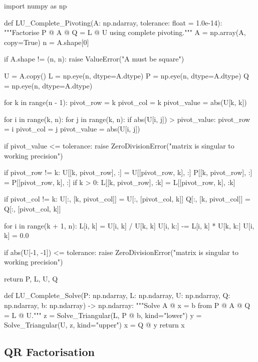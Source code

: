 \begin{python}
import numpy as np


def LU_Complete_Pivoting(A: np.ndarray,
                         tolerance: float = 1.0e-14):
    """Factorise P @ A @ Q = L @ U using complete pivoting."""
    A = np.array(A, copy=True)
    n = A.shape[0]

    if A.shape != (n, n):
        raise ValueError("A must be square")

    U = A.copy()
    L = np.eye(n, dtype=A.dtype)
    P = np.eye(n, dtype=A.dtype)
    Q = np.eye(n, dtype=A.dtype)

    for k in range(n - 1):
        pivot_row = k
        pivot_col = k
        pivot_value = abs(U[k, k])

        for i in range(k, n):
            for j in range(k, n):
                if abs(U[i, j]) > pivot_value:
                    pivot_row = i
                    pivot_col = j
                    pivot_value = abs(U[i, j])

        if pivot_value <= tolerance:
            raise ZeroDivisionError("matrix is singular to working precision")

        if pivot_row != k:
            U[[k, pivot_row], :] = U[[pivot_row, k], :]
            P[[k, pivot_row], :] = P[[pivot_row, k], :]
            if k > 0:
                L[[k, pivot_row], :k] = L[[pivot_row, k], :k]

        if pivot_col != k:
            U[:, [k, pivot_col]] = U[:, [pivot_col, k]]
            Q[:, [k, pivot_col]] = Q[:, [pivot_col, k]]

        for i in range(k + 1, n):
            L[i, k] = U[i, k] / U[k, k]
            U[i, k:] -= L[i, k] * U[k, k:]
            U[i, k] = 0.0

    if abs(U[-1, -1]) <= tolerance:
        raise ZeroDivisionError("matrix is singular to working precision")

    return P, L, U, Q


def LU_Complete_Solve(P: np.ndarray,
                      L: np.ndarray,
                      U: np.ndarray,
                      Q: np.ndarray,
                      b: np.ndarray) -> np.ndarray:
    """Solve A @ x = b from P @ A @ Q = L @ U."""
    z = Solve_Triangular(L, P @ b, kind="lower")
    y = Solve_Triangular(U, z, kind="upper")
    x = Q @ y
    return x
\end{python}

\subsection{QR Factorisation}

